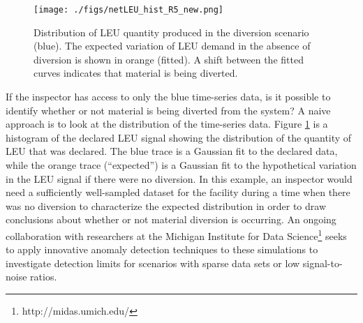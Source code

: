 \begin{figure}
\begin{center}
\texttt{[image: ./figs/netLEU\_hist\_R5\_new.png]}
\end{center}
\caption{Distribution of LEU quantity produced in the diversion scenario (blue). The expected variation of \gls{LEU} demand in the absence of diversion is shown in orange (fitted).  A shift between the fitted curves indicates that material is being diverted.}
\label{fig:leu_histogram}
\end{figure}

If the inspector has access to only the blue time-series data, is it possible to identify whether or not material is being diverted from the system?  A naive approach is to look at the distribution of the time-series data.  Figure \ref{fig:leu_histogram} is a histogram of the declared \gls{LEU} signal showing the distribution of the quantity of \gls{LEU} that was declared.  The blue trace is a Gaussian fit to the declared data, while the orange trace (``expected'') is a Gaussian fit to the hypothetical variation in the \gls{LEU} signal if there were no diversion.  In this example, an inspector would need a sufficiently well-sampled dataset for the facility during a time when there was no diversion to characterize the expected distribution in order to draw conclusions about whether or not material diversion is occurring. An ongoing collaboration with researchers at the Michigan Institute for Data Science\footnote{http://midas.umich.edu/} seeks to apply innovative anomaly detection techniques to these simulations to investigate detection limits for scenarios with sparse data sets or low signal-to-noise ratios.





  
